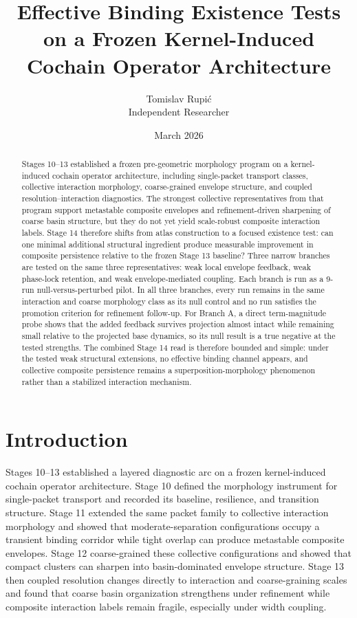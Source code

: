 \documentclass[11pt]{article}
\title{Effective Binding Existence Tests on a Frozen Kernel-Induced Cochain Operator Architecture}
\author{Tomislav Rupi\'c \\ Independent Researcher}
\date{March 2026}
\begin{document}
\maketitle

\begin{abstract}
Stages 10--13 established a frozen pre-geometric morphology program on a kernel-induced cochain operator architecture, including single-packet transport classes, collective interaction morphology, coarse-grained envelope structure, and coupled resolution--interaction diagnostics. The strongest collective representatives from that program support metastable composite envelopes and refinement-driven sharpening of coarse basin structure, but they do not yet yield scale-robust composite interaction labels. Stage 14 therefore shifts from atlas construction to a focused existence test: can one minimal additional structural ingredient produce measurable improvement in composite persistence relative to the frozen Stage 13 baseline? Three narrow branches are tested on the same three representatives: weak local envelope feedback, weak phase-lock retention, and weak envelope-mediated coupling. Each branch is run as a 9-run null-versus-perturbed pilot. In all three branches, every run remains in the same interaction and coarse morphology class as its null control and no run satisfies the promotion criterion for refinement follow-up. For Branch A, a direct term-magnitude probe shows that the added feedback survives projection almost intact while remaining small relative to the projected base dynamics, so its null result is a true negative at the tested strengths. The combined Stage 14 read is therefore bounded and simple: under the tested weak structural extensions, no effective binding channel appears, and collective composite persistence remains a superposition-morphology phenomenon rather than a stabilized interaction mechanism.
\end{abstract}

\section{Introduction}

Stages 10--13 established a layered diagnostic arc on a frozen kernel-induced cochain operator architecture. Stage 10 defined the morphology instrument for single-packet transport and recorded its baseline, resilience, and transition structure. Stage 11 extended the same packet family to collective interaction morphology and showed that moderate-separation configurations occupy a transient binding corridor while tight overlap can produce metastable composite envelopes. Stage 12 coarse-grained these collective configurations and showed that compact clusters can sharpen into basin-dominated envelope structure. Stage 13 then coupled resolution changes directly to interaction and coarse-graining scales and found that coarse basin organization strengthens under refinement while composite interaction labels remain fragile, especially under width coupling.
\end{document}
